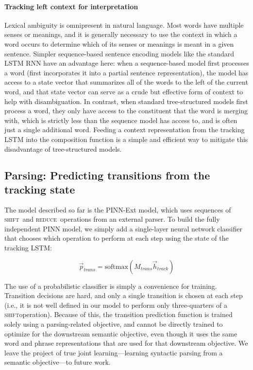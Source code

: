 \documentclass[11pt,letterpaper]{article}
\newcommand{\shift}{\textsc{shift}}
\newcommand{\reduce}{\textsc{reduce}}
\begin{document}
\paragraph{Tracking left context for interpretation} Lexical ambiguity is omnipresent in natural language. Most words have multiple senses or meanings, and it is generally necessary to use the context in which a word occurs to determine which of its senses or meanings is meant in a given sentence. Simpler sequence-based sentence encoding models like the standard LSTM RNN have an advantage here: when a sequence-based model first processes a word (first incorporates it into a partial sentence representation), the model has access to a state vector that summarizes all of the words to the left of the current word, and that state vector can serve as a crude but effective form of context to help with disambiguation. In contrast, when standard tree-structured models first process a word, they only have access to the constituent that the word is merging with, which is strictly less than the sequence model has access to, and is often just a single additional word. Feeding a context representation from the tracking LSTM into the composition function is a simple and efficient way to mitigate this disadvantage of tree-structured models.

\subsection{Parsing: Predicting transitions from the tracking state}

The model described so far is the PINN-Ext model, which uses sequences of \shift~and \reduce~operations from an external parser. To build the fully independent PINN model, we simply add a single-layer neural network classifier that chooses which operation to perform at each step using the state of the tracking LSTM:

\begin{equation}
\vec{p}_{trans} = \text{softmax}(M_{trans}\vec{h}_{track})
\end{equation}

The use of a probabilistic classifier is simply a convenience for training. Transition decisions are hard, and only a single transition is chosen at each step (i.e., it is not well defined in our model to perform only three-quarters of a \shift operation). Because of this, the transition prediction function is trained solely using a parsing-related objective, and cannot be directly trained to optimize for the downstream semantic objective, even though it uses the same word and phrase representations that are used for that downstream objective. We leave the project of true joint learning---learning syntactic parsing from a semantic objective---to future work.
\end{document}
